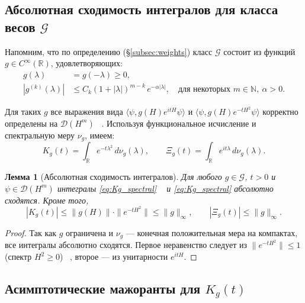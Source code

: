 \documentclass{article}
\numberwithin{equation}{section}
\theoremstyle{plain}
\newtheorem{lemma}{Лемма}
\theoremstyle{definition}
\theoremstyle{remark}
\def\alpha{α}\def\beta{β}\def\gamma{γ}\def\Gamma{Γ}%
\def\infty{∞}\def\partial{∂}\def\sum{Σ}\def\int{∫}%
\def\cdot{·}\def\times{×}\def\pm{±}\def\mp{∓}\def\approx{≈}%
\begin{document}
\subsection{Абсолютная сходимость интегралов для класса весов $\mathcal G$}
\label{subsec:absolute_conv}

Напомним, что по определению (§\ref{subsec:weights}) класс $\mathcal G$ состоит из функций
$g\in C^\infty(\mathbb R)$, удовлетворяющих:
\begin{equation}
	\label{eq:G_conditions}
	\begin{aligned}
		g(\lambda)&=g(-\lambda)\ge0,\\
		|g^{(k)}(\lambda)|&\le C_k(1+|\lambda|)^{m-k}\,e^{-\alpha|\lambda|},\quad
		\text{для некоторых }m\in\mathbb N,\ \alpha>0.
	\end{aligned}
\end{equation}

Для таких $g$ все выражения вида $\langle\psi,g(H)e^{itH}\psi\rangle$ и
$\langle\psi,g(H)e^{-tH^2}\psi\rangle$ корректно определены на $\mathcal D(H^m)$ ~\cite{DunfordSchwartz}.
Используя функциональное исчисление и спектральную меру $\nu_g$, имеем:
\begin{equation}
\label{eq:Kg_spectral}
K_g(t)=\int_{\mathbb R} e^{-t\lambda^2}\,d\nu_g(\lambda),
\qquad
\Xi_g(t)=\int_{\mathbb R} e^{it\lambda}\,d\nu_g(\lambda).
\end{equation}

\begin{lemma}[Абсолютная сходимость интегралов]
\label{lem:abs_conv}
Для любого $g\in\mathcal G$, $t>0$ и $\psi\in\mathcal D(H^m)$
интегралы \eqref{eq:Kg_spectral} ~\cite{BirmanSolomyak} и \eqref{eq:Kg_spectral} абсолютно сходятся.
Кроме того,
\begin{equation}
\label{eq:abs_bounds}
|K_g(t)|\le \|g(H)\|\cdot\|e^{-tH^2}\|\le \|g\|_\infty,
\qquad
|\Xi_g(t)|\le \|g\|_\infty.
\end{equation}
\end{lemma}

\begin{proof}
Так как $g$ ограничена и $\nu_g$ --- конечная положительная мера на компактах,
все интегралы абсолютно сходятся. Первое неравенство следует из
$\|e^{-tH^2}\|\le1$ (спектр $H^2\ge0$) ~\cite{Pazy1983}, второе --- из унитарности $e^{itH}$.
\end{proof}

\subsection{Асимптотические мажоранты для $K_g(t)$}
\label{subsec:Kg_bounds}
\end{document}
